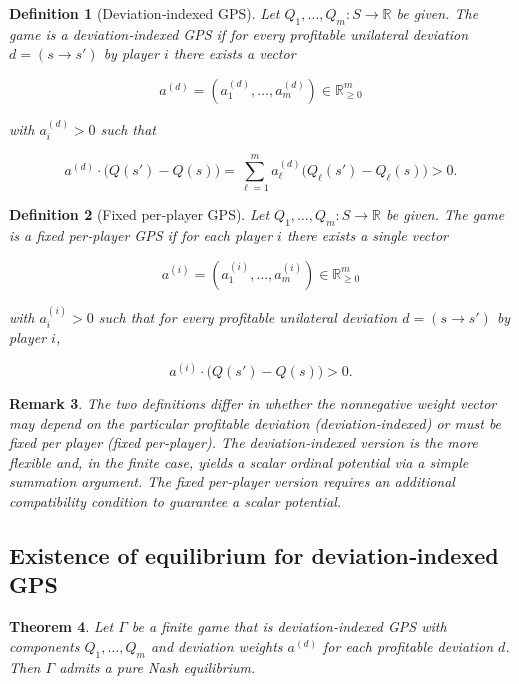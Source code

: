 \documentclass[11pt]{article}
\newtheorem{theorem}{Theorem}[section]
\newtheorem{definition}[theorem]{Definition}
\newtheorem{remark}[theorem]{Remark}
\begin{document}
\begin{definition}[Deviation‑indexed GPS]
Let $Q_1,\dots,Q_m:S\to\mathbb R$ be given. The game is a \emph{deviation‑indexed GPS} if for every profitable unilateral deviation $d=(s\to s')$ by player $i$ there exists a vector


\[
a^{(d)}=(a^{(d)}_1,\dots,a^{(d)}_m)\in\mathbb R^m_{\ge0}
\]


with $a^{(d)}_i>0$ such that


\[
a^{(d)}\cdot\big(Q(s')-Q(s)\big)=\sum_{\ell=1}^m a^{(d)}_\ell\big(Q_\ell(s')-Q_\ell(s)\big)>0.
\]


\end{definition}

\begin{definition}[Fixed per‑player GPS]
Let $Q_1,\dots,Q_m:S\to\mathbb R$ be given. The game is a \emph{fixed per‑player GPS} if for each player $i$ there exists a single vector


\[
a^{(i)}=(a^{(i)}_1,\dots,a^{(i)}_m)\in\mathbb R^m_{\ge0}
\]


with $a^{(i)}_i>0$ such that for every profitable unilateral deviation $d=(s\to s')$ by player $i$,


\[
a^{(i)}\cdot\big(Q(s')-Q(s)\big)>0.
\]


\end{definition}

\begin{remark}
The two definitions differ in whether the nonnegative weight vector may depend on the particular profitable deviation (deviation‑indexed) or must be fixed per player (fixed per‑player). The deviation‑indexed version is the more flexible and, in the finite case, yields a scalar ordinal potential via a simple summation argument. The fixed per‑player version requires an additional compatibility condition to guarantee a scalar potential.
\end{remark}
\subsection{Existence of equilibrium for deviation‑indexed GPS}

\begin{theorem}\label{thm:dev-indexed}
Let $\Gamma$ be a finite game that is deviation‑indexed GPS with components $Q_1,\dots,Q_m$ and deviation weights $a^{(d)}$ for each profitable deviation $d$. Then $\Gamma$ admits a pure Nash equilibrium.
\end{theorem}
\end{document}
